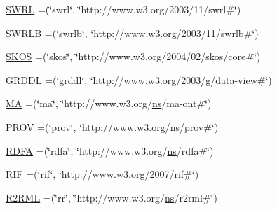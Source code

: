 \begin{DoxyCompactItemize}
\hyperlink{enumorg_1_1semanticweb_1_1owlapi_1_1vocab_1_1_namespaces_aaef6dd17f5027ab54711f35606c08964}{S\-W\-R\-L} =(\char`\"{}swrl\char`\"{}, \char`\"{}http\-://www.\-w3.\-org/2003/11/swrl\#\char`\"{})
\item 
\hyperlink{enumorg_1_1semanticweb_1_1owlapi_1_1vocab_1_1_namespaces_a2a7fc9fa3210353720c12879b672db41}{S\-W\-R\-L\-B} =(\char`\"{}swrlb\char`\"{}, \char`\"{}http\-://www.\-w3.\-org/2003/11/swrlb\#\char`\"{})
\item 
\hyperlink{enumorg_1_1semanticweb_1_1owlapi_1_1vocab_1_1_namespaces_ad1bd8118e45698d106a4bccb2d27b98b}{S\-K\-O\-S} =(\char`\"{}skos\char`\"{}, \char`\"{}http\-://www.\-w3.\-org/2004/02/skos/core\#\char`\"{})
\item 
\hyperlink{enumorg_1_1semanticweb_1_1owlapi_1_1vocab_1_1_namespaces_ab7cd228d53119ae4758c2a74c9709fe1}{G\-R\-D\-D\-L} =(\char`\"{}grddl\char`\"{}, \char`\"{}http\-://www.\-w3.\-org/2003/g/data-\/view\#\char`\"{})
\item 
\hyperlink{enumorg_1_1semanticweb_1_1owlapi_1_1vocab_1_1_namespaces_a83bab0f8ccb78f35fc420d382e6df530}{M\-A} =(\char`\"{}ma\char`\"{}, \char`\"{}http\-://www.\-w3.\-org/\hyperlink{enumorg_1_1semanticweb_1_1owlapi_1_1vocab_1_1_namespaces_a88428054d2db7e7520b71b395aef20ac}{ns}/ma-\/ont\#\char`\"{})
\item 
\hyperlink{enumorg_1_1semanticweb_1_1owlapi_1_1vocab_1_1_namespaces_a92e9066a36b87ea21e2eb7af71f3fbb9}{P\-R\-O\-V} =(\char`\"{}prov\char`\"{}, \char`\"{}http\-://www.\-w3.\-org/\hyperlink{enumorg_1_1semanticweb_1_1owlapi_1_1vocab_1_1_namespaces_a88428054d2db7e7520b71b395aef20ac}{ns}/prov\#\char`\"{})
\item 
\hyperlink{enumorg_1_1semanticweb_1_1owlapi_1_1vocab_1_1_namespaces_a537bb90d86b38d02fa6d39c07cd69b53}{R\-D\-F\-A} =(\char`\"{}rdfa\char`\"{}, \char`\"{}http\-://www.\-w3.\-org/\hyperlink{enumorg_1_1semanticweb_1_1owlapi_1_1vocab_1_1_namespaces_a88428054d2db7e7520b71b395aef20ac}{ns}/rdfa\#\char`\"{})
\item 
\hyperlink{enumorg_1_1semanticweb_1_1owlapi_1_1vocab_1_1_namespaces_a3c0a9110ee538f30bded5dfed0da95d3}{R\-I\-F} =(\char`\"{}rif\char`\"{}, \char`\"{}http\-://www.\-w3.\-org/2007/rif\#\char`\"{})
\item 
\hyperlink{enumorg_1_1semanticweb_1_1owlapi_1_1vocab_1_1_namespaces_a01a27aa171d758e65853c452bd9209a1}{R2\-R\-M\-L} =(\char`\"{}rr\char`\"{}, \char`\"{}http\-://www.\-w3.\-org/\hyperlink{enumorg_1_1semanticweb_1_1owlapi_1_1vocab_1_1_namespaces_a88428054d2db7e7520b71b395aef20ac}{ns}/r2rml\#\char`\"{})

\end{DoxyCompactItemize}
